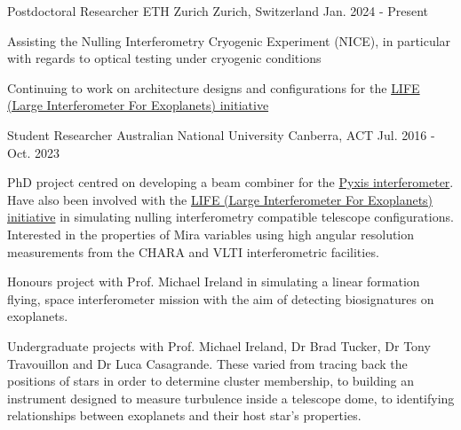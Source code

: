
\begin{cventries}

\cventry
  {Postdoctoral Researcher} %
  {ETH Zurich} %
  {Zurich, Switzerland} %
  {Jan. 2024 - Present} %
  {
    \begin{cvitems} %
      \item {Assisting the Nulling Interferometry Cryogenic Experiment (NICE), in particular with regards to optical testing under cryogenic conditions}
      \item {Continuing to work on architecture designs and configurations for the \href{https://www.life-space-mission.com}{LIFE (Large Interferometer For Exoplanets) initiative}}
     \end{cvitems}
  }

\cventry
    {Student Researcher} %
    {Australian National University} %
    {Canberra, ACT} %
    {Jul. 2016 - Oct. 2023} %
    {
      \begin{cvitems} %
        \item {PhD project centred on developing a beam combiner for the \href{https://www.mso.anu.edu.au/pyxis}{Pyxis interferometer}. Have also been involved with the \href{https://www.life-space-mission.com}{LIFE (Large Interferometer For Exoplanets) initiative} in simulating nulling interferometry compatible telescope configurations. Interested in the properties of Mira variables using high angular resolution measurements from the CHARA and VLTI interferometric facilities.}
        \item {Honours project with Prof. Michael Ireland in simulating a linear formation flying, space interferometer mission with the aim of detecting biosignatures on exoplanets.}
        \item {Undergraduate projects with Prof. Michael Ireland, Dr Brad Tucker, Dr Tony Travouillon and Dr Luca Casagrande. These varied from tracing back the positions of stars in order to determine cluster membership, to building an instrument designed to measure turbulence inside a telescope dome, to identifying relationships between exoplanets and their host star's properties.}
      \end{cvitems}
    }


\end{cventries}
